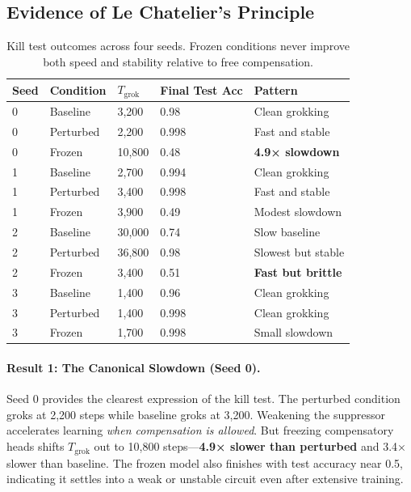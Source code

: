 \subsection{Evidence of Le Chatelier's Principle}

\begin{table}[h]
\centering
\caption{Kill test outcomes across four seeds. Frozen conditions never improve both speed and stability relative to free compensation.}
\label{tab:killtest}
\begin{tabular}{lllll}
\toprule
Seed & Condition & $T_{\text{grok}}$ & Final Test Acc & Pattern \\
\midrule
0 & Baseline  & 3,200  & 0.98  & Clean grokking \\
0 & Perturbed & 2,200  & 0.998 & Fast and stable \\
0 & Frozen    & 10,800 & 0.48  & \textbf{4.9× slowdown} \\
\midrule
1 & Baseline  & 2,700  & 0.994 & Clean grokking \\
1 & Perturbed & 3,400  & 0.998 & Fast and stable \\
1 & Frozen    & 3,900  & 0.49  & Modest slowdown \\
\midrule
2 & Baseline  & 30,000 & 0.74  & Slow baseline \\
2 & Perturbed & 36,800 & 0.98  & Slowest but stable \\
2 & Frozen    & 3,400  & 0.51  & \textbf{Fast but brittle} \\
\midrule
3 & Baseline  & 1,400  & 0.96  & Clean grokking \\
3 & Perturbed & 1,400  & 0.998 & Clean grokking \\
3 & Frozen    & 1,700  & 0.998 & Small slowdown \\
\bottomrule
\end{tabular}
\end{table}

\paragraph{Result 1: The Canonical Slowdown (Seed 0).}
Seed 0 provides the clearest expression of the kill test. The perturbed condition groks at 2,200 steps while baseline groks at 3,200. Weakening the suppressor accelerates learning \emph{when compensation is allowed}. But freezing compensatory heads shifts $T_{\text{grok}}$ out to 10,800 steps—\textbf{4.9× slower than perturbed} and 3.4× slower than baseline. The frozen model also finishes with test accuracy near 0.5, indicating it settles into a weak or unstable circuit even after extensive training.

